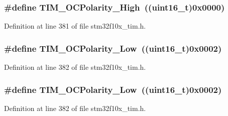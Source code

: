 \subsubsection[{\texorpdfstring{T\+I\+M\+\_\+\+O\+C\+Polarity\+\_\+\+High}{TIM_OCPolarity_High}}]{\setlength{\rightskip}{0pt plus 5cm}\#define T\+I\+M\+\_\+\+O\+C\+Polarity\+\_\+\+High~(({\bf uint16\+\_\+t})0x0000)}\hypertarget{group___t_i_m___output___compare___polarity_gaba2f2de6fd722b8973e0eddeb8644022}{}\label{group___t_i_m___output___compare___polarity_gaba2f2de6fd722b8973e0eddeb8644022}


Definition at line 381 of file stm32f10x\+\_\+tim.\+h.

\subsubsection[{\texorpdfstring{T\+I\+M\+\_\+\+O\+C\+Polarity\+\_\+\+Low}{TIM_OCPolarity_Low}}]{\setlength{\rightskip}{0pt plus 5cm}\#define T\+I\+M\+\_\+\+O\+C\+Polarity\+\_\+\+Low~(({\bf uint16\+\_\+t})0x0002)}\hypertarget{group___t_i_m___output___compare___polarity_ga9f4b11953dbd2c6f836b6913469dcf54}{}\label{group___t_i_m___output___compare___polarity_ga9f4b11953dbd2c6f836b6913469dcf54}


Definition at line 382 of file stm32f10x\+\_\+tim.\+h.

\subsubsection[{\texorpdfstring{T\+I\+M\+\_\+\+O\+C\+Polarity\+\_\+\+Low}{TIM_OCPolarity_Low}}]{\setlength{\rightskip}{0pt plus 5cm}\#define T\+I\+M\+\_\+\+O\+C\+Polarity\+\_\+\+Low~(({\bf uint16\+\_\+t})0x0002)}\hypertarget{group___t_i_m___output___compare___polarity_ga9f4b11953dbd2c6f836b6913469dcf54}{}\label{group___t_i_m___output___compare___polarity_ga9f4b11953dbd2c6f836b6913469dcf54}


Definition at line 382 of file stm32f10x\+\_\+tim.\+h.

